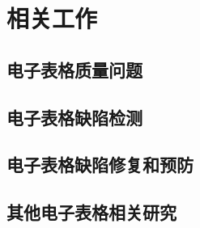 \chapter{相关工作}

\section{电子表格质量问题}


\section{电子表格缺陷检测}


\section{电子表格缺陷修复和预防}


\section{其他电子表格相关研究}